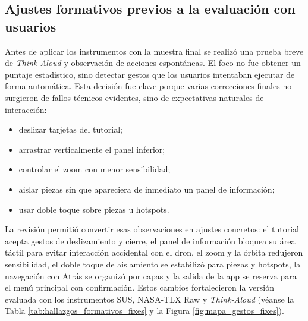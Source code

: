 \subsection{Ajustes formativos previos a la evaluación con usuarios}

Antes de aplicar los instrumentos con la muestra final se realizó una prueba breve de \textit{Think-Aloud} y observación de acciones espontáneas. El foco no fue obtener un puntaje estadístico, sino detectar gestos que los usuarios intentaban ejecutar de forma automática. Esta decisión fue clave porque varias correcciones finales no surgieron de fallos técnicos evidentes, sino de expectativas naturales de interacción:
\begin{itemize}
    \item deslizar tarjetas del tutorial;
    \item arrastrar verticalmente el panel inferior;
    \item controlar el zoom con menor sensibilidad;
    \item aislar piezas sin que apareciera de inmediato un panel de información;
    \item usar doble toque sobre piezas u hotspots.
\end{itemize}

La revisión permitió convertir esas observaciones en ajustes concretos: el tutorial acepta gestos de deslizamiento y cierre, el panel de información bloquea su área táctil para evitar interacción accidental con el dron, el zoom y la órbita redujeron sensibilidad, el doble toque de aislamiento se estabilizó para piezas y hotspots, la navegación con Atrás se organizó por capas y la salida de la app se reserva para el menú principal con confirmación. Estos cambios fortalecieron la versión evaluada con los instrumentos SUS, NASA-TLX Raw y \textit{Think-Aloud} (véanse la Tabla \ref{tab:hallazgos_formativos_fixes} y la Figura \ref{fig:mapa_gestos_fixes}).

